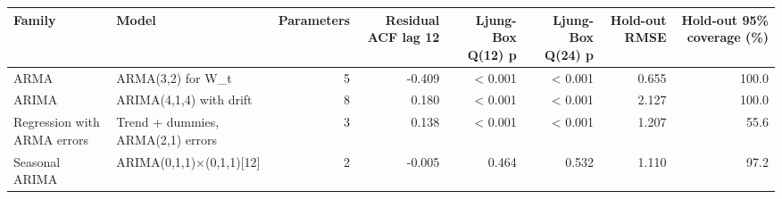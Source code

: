
\begin{tabular}[t]{llrrrrrr}
\toprule
Family & Model & Parameters & Residual ACF lag 12 & Ljung-Box Q(12) p & Ljung-Box Q(24) p & Hold-out RMSE & Hold-out 95\% coverage (\%)\\
\midrule
ARMA & ARMA(3,2) for W\_t & 5 & -0.409 & < 0.001 & < 0.001 & 0.655 & 100.0\\
ARIMA & ARIMA(4,1,4) with drift & 8 & 0.180 & < 0.001 & < 0.001 & 2.127 & 100.0\\
Regression with ARMA errors & Trend + dummies, ARMA(2,1) errors & 3 & 0.138 & < 0.001 & < 0.001 & 1.207 & 55.6\\
Seasonal ARIMA & ARIMA(0,1,1)×(0,1,1)[12] & 2 & -0.005 & 0.464 & 0.532 & 1.110 & 97.2\\
\bottomrule
\end{tabular}
